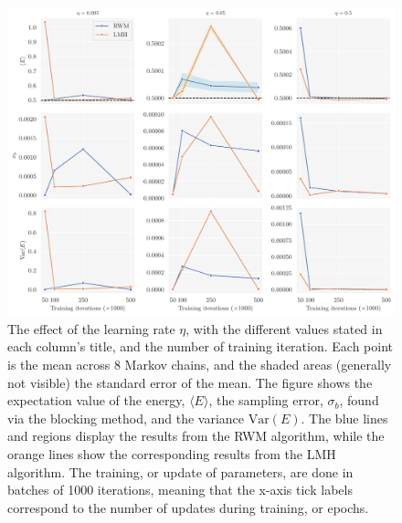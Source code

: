 \begin{figure}[!htb]
\begin{center}\includegraphics[width=\textwidth]{latex/figures/training_cycles_lr_batch1000.pdf}
\end{center}
\caption{The effect of the learning rate $\eta$, with the different values stated in each column's title, and the number of training iteration. Each point is the mean across 8 Markov chains, and the shaded areas (generally not visible) the standard error of the mean. The figure shows the expectation value of the energy, $\langle E \rangle$, the sampling error, $\sigma_b$, found via the blocking method, and the variance $\mathrm{Var}(E)$. The blue lines and regions display the results from the RWM algorithm, while the orange lines show the corresponding results from the LMH algorithm. The training, or update of parameters, are done in batches of 1000 iterations, meaning that the x-axis tick labels correspond to the number of updates during training, or epochs.
}
\label{fig:train_iter_lr_batch1000}
\end{figure}

